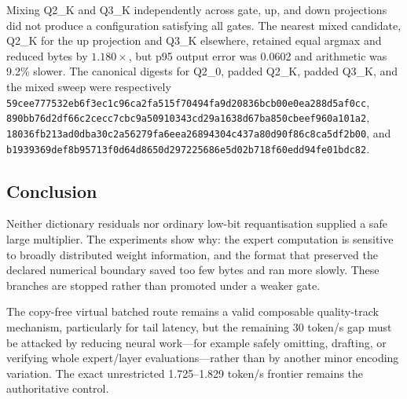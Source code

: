Mixing Q2\_K and Q3\_K independently across gate, up, and down projections did
not produce a configuration satisfying all gates.  The nearest mixed candidate,
Q2\_K for the up projection and Q3\_K elsewhere, retained equal argmax and
reduced bytes by $1.180\times$, but p95 output error was 0.0602 and arithmetic
was 9.2\% slower.  The canonical digests for Q2\_0, padded Q2\_K, padded Q3\_K,
and the mixed sweep were respectively
\texttt{59cee777532eb6f3ec1c96ca2fa515f70494fa9d20836bcb00e0ea288d5af0cc},
\texttt{890bb76d2df66c2cecc7cbc9a50910343cd29a1638d67ba850cbeef960a101a2},
\texttt{18036fb213ad0dba30c2a56279fa6eea26894304c437a80d90f86c8ca5df2b00},
and
\texttt{b1939369def8b95713f0d64d8650d297225686e5d02b718f60edd94fe01bdc82}.

\subsection{Conclusion}

Neither dictionary residuals nor ordinary low-bit requantisation supplied a
safe large multiplier.  The experiments show why: the expert computation is
sensitive to broadly distributed weight information, and the format that
preserved the declared numerical boundary saved too few bytes and ran more
slowly.  These branches are stopped rather than promoted under a weaker gate.

The copy-free virtual batched route remains a valid composable quality-track
mechanism, particularly for tail latency, but the remaining 30 token/s gap must
be attacked by reducing neural work---for example safely omitting, drafting, or
verifying whole expert/layer evaluations---rather than by another minor encoding
variation.  The exact unrestricted 1.725--1.829 token/s frontier remains the
authoritative control.
